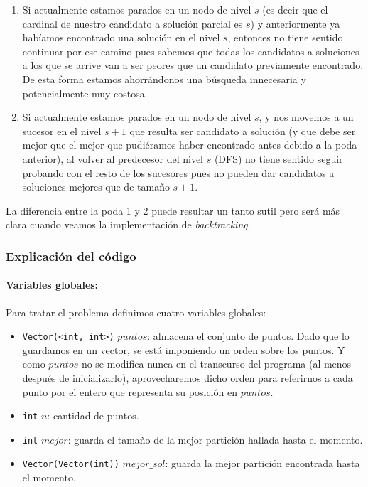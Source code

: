 \begin{enumerate}
  \item Si actualmente estamos parados en un nodo de nivel $s$ (es decir que el cardinal de nuestro candidato a solución parcial es $s$) y anteriormente ya habíamos encontrado una solución en el nivel $s$, entonces no tiene sentido continuar por ese camino pues sabemos que todas los candidatos a soluciones a los que se arrive van a ser peores que un candidato previamente encontrado. De esta forma estamos ahorrándonos una búsqueda innecesaria y potencialmente muy costosa.
  \item Si actualmente estamos parados en un nodo de nivel $s$, y nos movemos a un sucesor en el nivel $s+1$ que resulta ser candidato a solución (y que debe ser mejor que el mejor que pudiéramos haber encontrado antes debido a la poda anterior), al volver al predecesor del nivel $s$ (DFS) no tiene sentido seguir probando con el resto de los sucesores pues no pueden dar candidatos a soluciones mejores que de tamaño $s+1$.
\end{enumerate}

La diferencia entre la poda 1 y 2 puede resultar un tanto sutil pero será más clara cuando veamos la implementación de \textit{backtracking}.

\subsubsection{Explicación del código}
  \paragraph{Variables globales:} Para tratar el problema definimos cuatro variables globales:
  \begin{itemize}
    \item \texttt{Vector(<int, int>)} $puntos$: almacena el conjunto de puntos. Dado que lo guardamos en un vector, se está imponiendo un orden sobre los puntos. Y como $puntos$ no se modifica nunca en el transcurso del programa (al menos después de inicializarlo), aprovecharemos dicho orden para referirnos a cada punto por el entero que representa su posición en $puntos$.
    \item \texttt{int} $n$: cantidad de puntos.
    \item \texttt{int} $mejor$: guarda el tamaño de la mejor partición hallada hasta el momento.
    \item \texttt{Vector(Vector(int))} $mejor\_sol$: guarda la mejor partición encontrada hasta el momento.
  \end{itemize}
